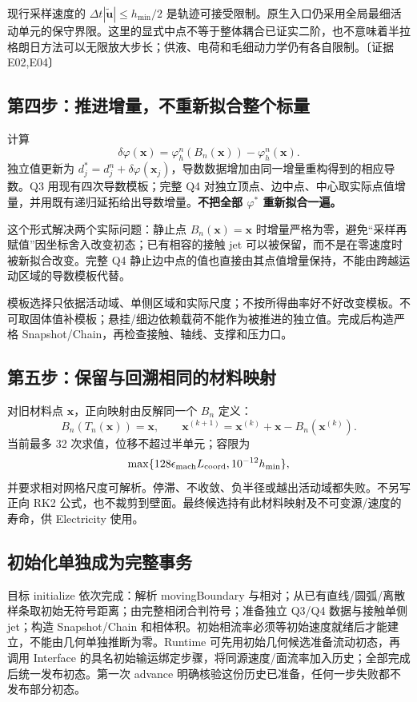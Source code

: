 \documentclass[UTF8,a4paper,11pt,fontset=fandol]{ctexart}
\newcommand{\ev}[1]{{\small\color{muted}〔证据 #1〕}}
\newcommand{\uu}{\bm u}\newcommand{\nn}{\bm n}\newcommand{\xx}{\bm x}
\newcommand{\ph}{\varphi}\newcommand{\dt}{\Delta t}
\begin{document}
现行采样速度的 $\dt|\widetilde{\uu}|\le h_{\min}/2$ 是轨迹可接受限制。原生入口仍采用全局最细活动单元的保守界限。这里的显式中点不等于整体耦合已证实二阶，也不意味着半拉格朗日方法可以无限放大步长；供液、电荷和毛细动力学仍有各自限制。\ev{E02,E04}

\subsection{第四步：推进增量，不重新拟合整个标量}
计算
\begin{equation}
 \delta\ph(\xx)=\ph_h^n(B_n(\xx))-\ph_h^n(\xx).
 \label{eq:increment}
\end{equation}
独立值更新为 $d_j^*=d_j^n+\delta\ph(\xx_j)$，导数数据增加由同一增量重构得到的相应导数。Q3 用现有四次导数模板；完整 Q4 对独立顶点、边中点、中心取实际点值增量，并用既有递归延拓给出导数增量。\textbf{不把全部 $\ph^*$ 重新拟合一遍。}

这个形式解决两个实际问题：静止点 $B_n(\xx)=\xx$ 时增量严格为零，避免“采样再赋值”因坐标舍入改变初态；已有相容的接触 jet 可以被保留，而不是在零速度时被新拟合改变。完整 Q4 静止边中点的值也直接由其点值增量保持，不能由跨越运动区域的导数模板代替。

模板选择只依据活动域、单侧区域和实际尺度；不按所得曲率好不好改变模板。不可取固体值补模板；悬挂/细边依赖载荷不能作为被推进的独立值。完成后构造严格 Snapshot/Chain，再检查接触、轴线、支撑和压力口。

\subsection{第五步：保留与回溯相同的材料映射}
对旧材料点 $\xx$，正向映射由反解同一个 $B_n$ 定义：
\begin{equation}
 B_n(T_n(\xx))=\xx,
 \qquad \xx^{(k+1)}=\xx^{(k)}+\xx-B_n(\xx^{(k)}).
 \label{eq:forward}
\end{equation}
当前最多 32 次求值，位移不超过半单元；容限为
\[
 \max\{128\epsilon_{\rm mach}L_{\rm coord},10^{-12}h_{\min}\},
\]
并要求相对网格尺度可解析。停滞、不收敛、负半径或越出活动域都失败。不另写正向 RK2 公式，也不裁剪到壁面。最终候选持有此材料映射及不可变源/速度的寿命，供 Electricity 使用。

\subsection{初始化单独成为完整事务}
目标 initialize 依次完成：解析 movingBoundary 与相对；从已有直线/圆弧/离散样条取初始无符号距离；由完整相闭合判符号；准备独立 Q3/Q4 数据与接触单侧 jet；构造 Snapshot/Chain 和相体积。初始相流率必须等初始速度就绪后才能建立，不能由几何单独推断为零。Runtime 可先用初始几何候选准备流动初态，再调用 Interface 的具名初始输运绑定步骤，将同源速度/面流率加入历史；全部完成后统一发布初态。第一次 advance 明确核验这份历史已准备，任何一步失败都不发布部分初态。
\end{document}
